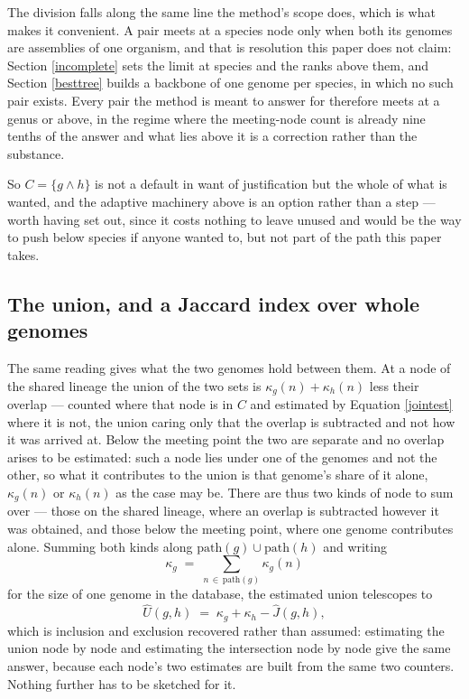 \documentclass[pdflatex,sn-vancouver-num]{sn-jnl}
\begin{document}
The division falls along the same line the method's scope does, which is what makes it convenient. A
pair meets at a species node only when both its genomes are assemblies of one organism, and that is
resolution this paper does not claim: Section \ref{incomplete} sets the limit at species and the ranks
above them, and Section \ref{besttree} builds a backbone of one genome per species, in which no such
pair exists. Every pair the method is meant to answer for therefore meets at a genus or above, in the
regime where the meeting-node count is already nine tenths of the answer and what lies above it is a
correction rather than the substance.

So $C = \{g \wedge h\}$ is not a default in want of justification but the whole of what is wanted, and
the adaptive machinery above is an option rather than a step --- worth having set out, since it costs
nothing to leave unused and would be the way to push below species if anyone wanted to, but not part
of the path this paper takes.

\subsection{The union, and a Jaccard index over whole genomes}\label{jaccardsec}

The same reading gives what the two genomes hold between them. At a node of the shared lineage the
union of the two sets is $\kappa_g(n) + \kappa_h(n)$ less their overlap --- counted where that node
is in $C$ and estimated by Equation \eqref{jointest} where it is not, the union caring only that the
overlap is subtracted and not how it was arrived at. Below the meeting point the two are separate and no overlap
arises to be estimated: such a node lies under one of the genomes and not the other, so what it
contributes to the union is that genome's share of it alone, $\kappa_g(n)$ or $\kappa_h(n)$ as the
case may be. There are thus two kinds of node to sum over --- those on the shared lineage, where an
overlap is subtracted however it was obtained, and those below the meeting point, where one genome
contributes alone. Summing both kinds
along $\mathrm{path}(g) \cup \mathrm{path}(h)$ and writing
%
\begin{equation}
  \kappa_g \;=\; \sum_{n \,\in\, \mathrm{path}(g)} \kappa_g(n)
  \label{genomesize}
\end{equation}
%
for the size of one genome in the database, the estimated union telescopes to
%
\begin{equation}
  \widehat{U}(g,h) \;=\; \kappa_g + \kappa_h - \widehat{J}(g,h) ,
  \label{unionest}
\end{equation}
%
which is inclusion and exclusion recovered rather than assumed: estimating the union node by node
and estimating the intersection node by node give the same answer, because each node's two estimates
are built from the same two counters. Nothing further has to be sketched for it.
\end{document}
